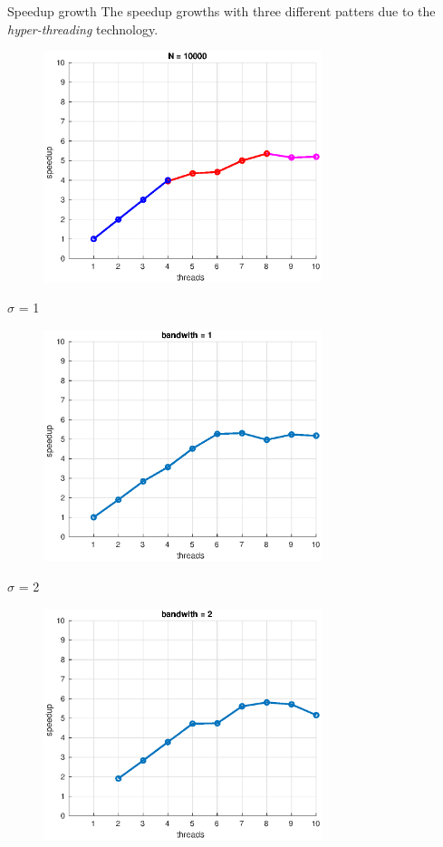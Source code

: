 \documentclass{beamer}
\begin{document}
\begin{frame}{Speedup growth}
The speedup growths with three different patters due to the \textit{hyper-threading} technology.

\begin{figure}[H]
\centering
\includegraphics[width=3.2in]{../Paper/fig/speedup10000Colors.eps}
\end{figure}
\end{frame}


\begin{frame}{$\sigma$ = 1}

\begin{figure}[H]
\centering
\includegraphics[width=3.2in]{../Paper/fig/speedup1b.eps}
\end{figure}

\end{frame}


\begin{frame}{$\sigma$ = 2}

\begin{figure}[H]
\centering
\includegraphics[width=3.2in]{../Paper/fig/speedup2b.eps}
\end{figure}

\end{frame}
\end{document}
